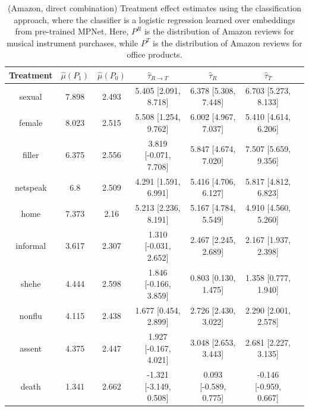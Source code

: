 \documentclass{article}
\begin{document}
\begin{table}[!ht]
    \centering
    \begin{tabular}{c|cccccc}
\toprule
      Treatment &   $\hat{\mu}(P_1)$ &   $\hat{\mu}(P_0)$ & $\hat{\tau}_{R \rightarrow T}$   & $\hat{\tau}_R$       & $\hat{\tau}_T$       \\
\midrule
     sexual      &              7.898 &              2.493 & 5.405 [2.091, 8.718]             & 6.378 [5.308, 7.448]  & 6.703 [5.273, 8.133]   \\
 female      &              8.023 &              2.515 & 5.508 [1.254, 9.762]             & 6.002 [4.967, 7.037]  & 5.410 [4.614, 6.206]   \\
 filler      &              6.375 &              2.556 & 3.819 [-0.071, 7.708]            & 5.847 [4.674, 7.020]  & 7.507 [5.659, 9.356]   \\
 netspeak    &              6.8   &              2.509 & 4.291 [1.591, 6.991]             & 5.416 [4.706, 6.127]  & 5.817 [4.812, 6.823]   \\
 home        &              7.373 &              2.16  & 5.213 [2.236, 8.191]             & 5.167 [4.784, 5.549]  & 4.910 [4.560, 5.260]   \\
 informal    &              3.617 &              2.307 & 1.310 [-0.031, 2.652]            & 2.467 [2.245, 2.689]  & 2.167 [1.937, 2.398]   \\
 shehe       &              4.444 &              2.598 & 1.846 [-0.166, 3.859]            & 0.803 [0.130, 1.475]  & 1.358 [0.777, 1.940]   \\
 nonflu      &              4.115 &              2.438 & 1.677 [0.454, 2.899]             & 2.726 [2.430, 3.022]  & 2.290 [2.001, 2.578]   \\
 assent      &              4.375 &              2.447 & 1.927 [-0.167, 4.021]            & 3.048 [2.653, 3.443]  & 2.681 [2.227, 3.135]   \\
 death       &              1.341 &              2.662 & -1.321 [-3.149, 0.508]           & 0.093 [-0.589, 0.775] & -0.146 [-0.959, 0.667] \\
 \bottomrule
    \end{tabular}
    \caption{(Amazon, direct combination) Treatment effect estimates using the classification approach, where the classifier is a logistic regression learned over embeddings from pre-trained MPNet. Here, $P^R$ is the distribution of Amazon reviews for musical instrument purchases, while $P^T$ is the distribution of Amazon reviews for office products.}
    \label{tab:results_clf_mpnet_amazon_synthetic}
\end{table}
\end{document}
